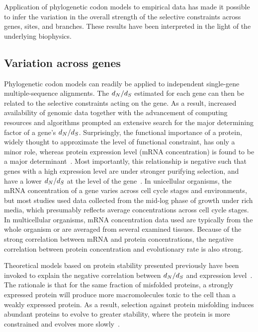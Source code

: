 Application of phylogenetic \gls{codon} models to empirical data has made it possible to infer the variation in the overall strength of the selective constraints across genes, sites, and branches.
These results have been interpreted in the light of the underlying biophysics.

\subsection{Variation across genes}
\label{subsec:thermo-variation-across-genes}

Phylogenetic \gls{codon} models can readily be applied to independent single-gene multiple-sequence alignments.
The $d_N / d_S$ estimated for each gene can then be related to the selective constraints acting on the gene.
As a result, increased availability of genomic data together with the advancement of computing resources and algorithms prompted an extensive search for the major determining factor of a gene's $d_N / d_S$.
Surprisingly, the functional importance of a protein, widely thought to approximate the level of functional constraint, has only a minor role, whereas protein expression level (mRNA concentration) is found to be a major determinant~\citep{Zhang2015}.
Most importantly, this relationship is negative such that genes with a high expression level are under stronger purifying selection, and have a lower $d_N / d_S$ at the level of the gene~\citep{Duret2000, Drummond2005a, Zhang2015}.
In unicellular organisms, the mRNA concentration of a gene varies across cell cycle stages and environments, but most studies used data collected from the mid-log phase of growth under rich media, which presumably reflects average concentrations across cell cycle stages.
In multicellular organisms, mRNA concentration data used are typically from the whole organism or are averaged from several examined tissues.
Because of the strong correlation between mRNA and protein concentrations, the negative correlation between protein concentration and evolutionary rate is also strong.

Theoretical models based on protein stability presented previously have been invoked to explain the negative correlation between $d_N / d_S$ and expression level~\citep{Wilke2006, Drummond2008}.
The rationale is that for the same fraction of misfolded proteins, a strongly expressed protein will produce more macromolecules toxic to the cell than a weakly expressed protein.
As a result, selection against protein misfolding induces abundant proteins to evolve to greater stability, where the protein is more constrained and evolves more slowly~\citep{Serohijos2012}.

